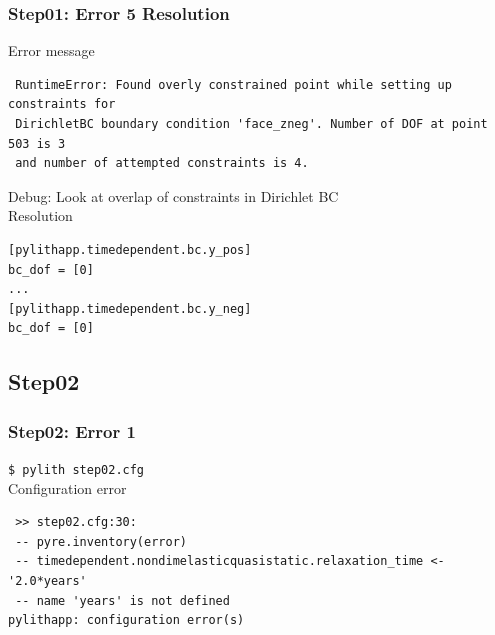 \documentclass{beamer}
\newcommand{\cmd}[1]{{\tiny\tt \color{ltred}#1}}
\newcommand{\errlabel}[1]{{\small \color{blue}#1}}
\newcommand{\debuginfo}[1]{{\small \color{green}#1}}
\begin{document}
\begin{frame}[fragile]
  \frametitle{Step01: Error 5 Resolution}

\errlabel{Error message}
\begin{lstlisting}
 RuntimeError: Found overly constrained point while setting up constraints for
 DirichletBC boundary condition 'face_zneg'. Number of DOF at point 503 is 3
 and number of attempted constraints is 4.
\end{lstlisting}\pause
\errlabel{Debug:} \debuginfo{Look at overlap of constraints in Dirichlet BC}\pause\\
\errlabel{Resolution}
\begin{lstlisting}
[pylithapp.timedependent.bc.y_pos]
bc_dof = [0]
...
[pylithapp.timedependent.bc.y_neg]
bc_dof = [0]
\end{lstlisting}

\end{frame}


\subsection{Step02}

\begin{frame}[fragile]
  \frametitle{Step02: Error 1}

\cmd{\$ pylith step02.cfg}\\
\errlabel{Configuration error}
\begin{lstlisting}
 >> step02.cfg:30:
 -- pyre.inventory(error)
 -- timedependent.nondimelasticquasistatic.relaxation_time <- '2.0*years'
 -- name 'years' is not defined
pylithapp: configuration error(s)
\end{lstlisting}
  
\end{frame}
\end{document}
